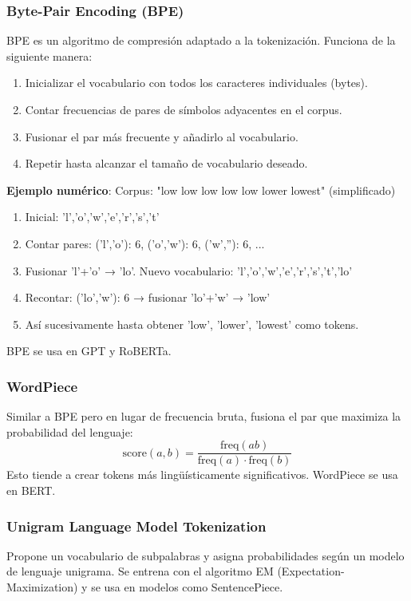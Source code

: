 \documentclass[12pt,a4paper,openany,oneside]{book}
\begin{document}
\subsubsection{Byte-Pair Encoding (BPE)}
BPE es un algoritmo de compresión adaptado a la tokenización. Funciona de la siguiente manera:

\begin{enumerate}
    \item Inicializar el vocabulario con todos los caracteres individuales (bytes).
    \item Contar frecuencias de pares de símbolos adyacentes en el corpus.
    \item Fusionar el par más frecuente y añadirlo al vocabulario.
    \item Repetir hasta alcanzar el tamaño de vocabulario deseado.
\end{enumerate}

\textbf{Ejemplo numérico}:
Corpus: "low low low low low lower lowest" (simplificado)
\begin{enumerate}
    \item Inicial: {'l','o','w','e','r','s','t'}
    \item Contar pares: ('l','o'): 6, ('o','w'): 6, ('w',''): 6, ...
    \item Fusionar 'l'+'o' → 'lo'. Nuevo vocabulario: {'l','o','w','e','r','s','t','lo'}
    \item Recontar: ('lo','w'): 6 → fusionar 'lo'+'w' → 'low'
    \item Así sucesivamente hasta obtener 'low', 'lower', 'lowest' como tokens.
\end{enumerate}

BPE se usa en GPT y RoBERTa.

\subsubsection{WordPiece}
Similar a BPE pero en lugar de frecuencia bruta, fusiona el par que maximiza la probabilidad del lenguaje:
\[
\text{score}(a,b) = \frac{\text{freq}(ab)}{\text{freq}(a) \cdot \text{freq}(b)}
\]
Esto tiende a crear tokens más lingüísticamente significativos. WordPiece se usa en BERT.

\subsubsection{Unigram Language Model Tokenization}
Propone un vocabulario de subpalabras y asigna probabilidades según un modelo de lenguaje unigrama. Se entrena con el algoritmo EM (Expectation-Maximization) y se usa en modelos como SentencePiece.
\end{document}
